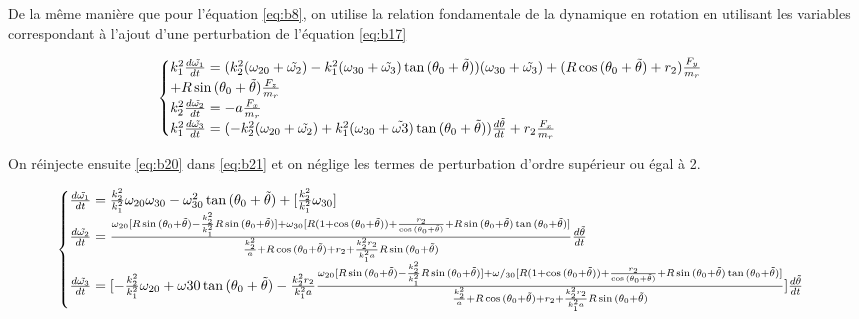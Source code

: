 De la même manière que pour l'équation \ref{eq:b8}, on utilise la relation fondamentale de la dynamique en rotation en utilisant les variables correspondant à l'ajout d'une perturbation de l'équation \ref{eq:b17}

\begin{equation}
  \begin{cases}
    k_1^2\frac{d\Tilde{\omega_1}}{dt} =(k_2^2(\omega_{20}+\Tilde{\omega_{2}})-k_1^2(\omega_{30}+\Tilde{\omega_3}) \tan{(\theta_0+\Tilde{\theta})})(\omega_{30}+\Tilde{\omega_3}) +(R\cos{(\theta_0+\Tilde{\theta})}+r_2)\frac{F_y}{m_r}\\
    + R\sin{(\theta_0+\Tilde{\theta})}\frac{F_z}{m_r} \\
    k_2^2\frac{d\Tilde{\omega_2}}{dt} =-a \frac{F_x}{m_r} \\
    k_1^2\frac{d\Tilde{\omega_3}}{dt} =(-k_2^2(\omega_{20}+\Tilde{\omega_2})+k_1^2(\omega_{30}+\Tilde{\omega3}) \tan{(\theta_0+\Tilde{\theta})})\frac{d\Tilde{\theta}}{dt} + r_2 \frac{F_x}{m_r}
  \end{cases}
  \label{eq:b21}
\end{equation}

On réinjecte ensuite \ref{eq:b20} dans \ref{eq:b21} et on néglige les termes de perturbation d'ordre supérieur ou égal à 2.

\begin{equation}
  \begin{cases}
    \frac{d\Tilde{\omega_1}}{dt}=\frac{k_2^2}{k_1^2}\omega_{20}\omega_{30}-\omega_{30}^2\tan{(\theta_0+\Tilde{\theta})}+[\frac{k_2^2}{k_1^2}\omega_{30}] \\
    
    \frac{d\Tilde{\omega_2}}{dt}=\frac{\omega_{20}[R\sin{(\theta_0+\Tilde{\theta})}-\frac{k_2^2}{k_1^2}R\sin{(\theta_0+\Tilde{\theta})}]+\omega_{30}[R(1+\cos{(\theta_0+\Tilde{\theta})})+\frac{r_2}{\cos{(\theta_0+\Tilde{\theta})}}+R\sin{(\theta_0+\Tilde{\theta})}\tan{(\theta_0+\Tilde{\theta})}]}{\frac{k_2^2}{a}+R\cos{(\theta_0+\Tilde{\theta})}+r_2+\frac{k_2^2 r_2}{k_1^2 a}R\sin{(\theta_0+\Tilde{\theta})}} \frac{d\Tilde{\theta}}{dt}\\
    
    \frac{d\Tilde{\omega_3}}{dt}=[-\frac{k_2^2}{k_1^2}\omega_{20}+\omega{30}\tan{(\theta_0+\Tilde{\theta})}-\frac{k_2^2 r_2}{k_1^2 a}\frac{\omega_{20}[R\sin{(\theta_0+\Tilde{\theta})}-\frac{k_2^2}{k_1^2}R\sin{(\theta_0+\Tilde{\theta})}]+\omega/_{30}[R(1+\cos{(\theta_0+\Tilde{\theta})})+\frac{r_2}{\cos{(\theta_0+\Tilde{\theta})}}+R\sin{(\theta_0+\Tilde{\theta})}\tan{(\theta_0+\Tilde{\theta})}]}{\frac{k_2^2}{a}+R\cos{(\theta_0+\Tilde{\theta})}+r_2+\frac{k_2^2 r_2}{k_1^2 a}R\sin{(\theta_0+\Tilde{\theta})}}]\frac{d\Tilde{\theta}}{dt}
  \end{cases}
  \label{eq:b21}
\end{equation}

